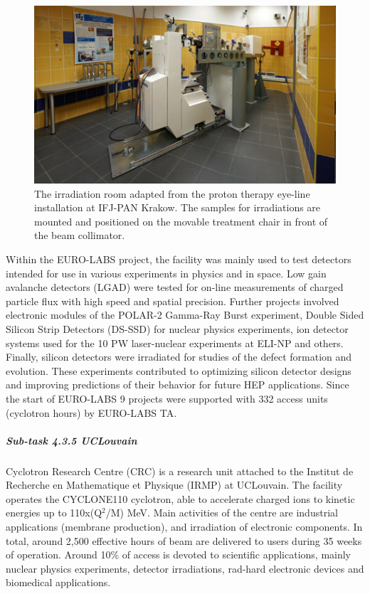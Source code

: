 \begin{figure}[!h]
    \centering
    \includegraphics[width=0.75\linewidth]{image10.png}
    \caption{The irradiation room adapted from the proton therapy eye-line installation at IFJ-PAN Krakow. The samples for irradiations are mounted and positioned on the movable treatment chair in front of the beam collimator.}
    \label{fig:4.3.4}
\end{figure}

Within the EURO-LABS project, the facility was mainly used to test detectors intended for use in various experiments in physics and in space. Low gain avalanche detectors (LGAD) were tested for on-line measurements of charged particle flux with high speed and spatial precision. Further projects involved electronic modules of the POLAR-2 Gamma-Ray Burst experiment, Double Sided Silicon Strip Detectors (DS-SSD) for nuclear physics experiments, ion detector systems used for the 10 PW laser-nuclear experiments at ELI-NP and others.  Finally, silicon detectors were irradiated for studies of the defect formation and evolution. These experiments contributed to optimizing silicon detector designs and improving predictions of their behavior for future HEP applications.  Since the start of EURO-LABS 9 projects were supported with 332 access units (cyclotron hours) by EURO-LABS TA.

\subparagraph{Sub-task 4.3.5 UCLouvain} \mbox{}

Cyclotron Research Centre (CRC) is a research unit attached to the Institut de Recherche en Mathematique et Physique (IRMP) at UCLouvain. The facility operates the CYCLONE110 cyclotron, able to accelerate charged ions to kinetic energies up to 110x(Q$^2$/M) MeV. Main activities of the centre are industrial applications (membrane production), and irradiation of electronic components. In total, around 2,500 effective hours of beam are delivered to users during 35 weeks of operation. Around 10\% of access is devoted to scientific applications, mainly nuclear physics experiments, detector irradiations, rad-hard electronic devices and biomedical applications.

